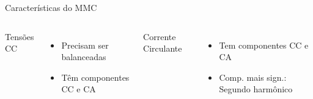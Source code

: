 \begin{frame}{Características do MMC}
\begin{columns}
Tensões CC
\begin{itemize}
	\item Precisam ser balanceadas\\[5pt]
	\item Têm componentes CC e CA\\[20pt]
\end{itemize}

Corrente Circulante
\begin{itemize}
	\item Tem componentes CC e CA\\[5pt]
	\item Comp. mais sign.: Segundo harmônico 
\end{itemize}

\end{columns}

\end{frame}






